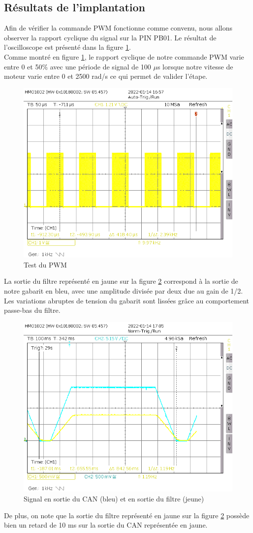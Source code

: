 \documentclass[a4paper]{article}
\begin{document}
\subsection{Résultats de l’implantation}
Afin de vérifier la commande PWM fonctionne comme convenu, nous allons observer la rapport cyclique du signal sur la PIN PB01. Le résultat de l'oscilloscope est présenté dans la figure \ref{pic_PWM}.~~\\
Comme montré en figure \ref{pic_PWM}, le rapport cyclique de notre commande PWM varie entre 0 et 50\% avec une période de signal de 100 $\mu$s lorsque notre vitesse de moteur varie entre 0 et 2500 rad/s ce qui permet de valider l'étape.\\
\begin{figure}[H]
\centering
\includegraphics[width=0.7\linewidth]{test_PWM.PNG}
\caption{Test du PWM}
\label{pic_PWM}
\end{figure}
\newpage
La sortie du filtre représenté en jaune sur la figure \ref{pic_att} correspond à la sortie de notre gabarit en bleu, avec une amplitude divisée par deux due au gain de 1/2. Les variations abruptes de tension du gabarit sont lissées grâce au comportement passe-bas du filtre.~~\\
\begin{figure}[H]
\centering
\includegraphics[width=0.7\linewidth]{gabarit_filtre.PNG}
\caption{Signal en sortie du CAN (bleu) et en sortie du filtre (jeune)}
\label{pic_att}
\end{figure}  
De plus, on note que la sortie du filtre représenté en jaune sur la figure \ref{pic_att} possède bien un retard de 10 ms sur la sortie du CAN représentée en jaune.
\end{document}
